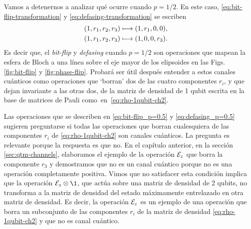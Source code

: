 Vamos a detenernos a analizar qué ocurre cuando $p=1/2$. 
En este caso, \eqref{eq:bit-flip-transformation} y
\eqref{eq:defasing-transformation} se escriben
\begin{align}\label{eq:bit-flip_p=0.5}
\qty(1,r_1,r_2,r_3)&\longmapsto \qty(1,r_1,0,0),\\
\qty(1,r_1,r_2,r_3)&\longmapsto \qty(1,0,0,r_3).\label{eq:defasing_p=0.5}
\end{align}
Es decir que, el \textit{bit-flip} y \textit{defasing} cuando $p=1/2$
son operaciones que mapean la esfera de Bloch a una línea sobre 
el eje mayor de los elipsoides en las Figs. \ref{fig:bit-flip} y \ref{fig:phase-flip}.
Probará ser útil después entender a estos canales cuánticos 
como operaciones que `borran' dos de las cuatro 
componentes $r_i$, y que dejan invariante a las otras dos, 
de la matriz de densidad de 1 qubit escrita en la base de matrices 
de Pauli como~en~\eqref{eq:rho-1qubit-ch2}. 


Las operaciones 	que se describen en \eqref{eq:bit-flip_p=0.5}
y \eqref{eq:defasing_p=0.5} sugieren preguntarse si todas las
operaciones que borran cualesquiera de las componentes $r_i$ 
de \eqref{eq:rho-1qubit-ch2} son canales cuánticos.
La pregunta es relevante porque la respuesta es
que no. En el capítulo anterior, en la sección 
\ref{sec:qtm-channels}, elaboramos el ejemplo de la operación $\mathcal{E}_z$
que borra la componente $r_3$ y demostramos que no es un canal 
cuántico porque no es una operación completamente positiva. 
Vimos que no satisfacer esta condición implica que la operación 
$\E_z\ot\1$, que actúa sobre una matriz de densidad de 2 qubits,
no transforma a la matriz 
de densidad del estado máximamente entrelazado en otra 
matriz de densidad.
Es decir, la operación $\mathcal{E}_z$ es un ejemplo de una 
operación que borra un subconjunto de las componentes $r_i$ de 
la matriz de densidad \eqref{eq:rho-1qubit-ch2} y que no es canal cuántico.

